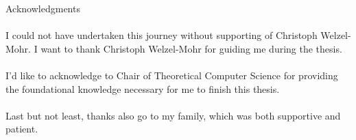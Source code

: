 \thispagestyle{empty}

\vspace*{20mm}

\begin{center}
    { Acknowledgments}
\end{center}

\vspace{10mm}
\paragraph{}
I could not have undertaken this journey without supporting of Christoph Welzel-Mohr.
I want to thank Christoph Welzel-Mohr for guiding me during the thesis.
\paragraph{}
I’d like to acknowledge to Chair of Theoretical Computer Science
for providing the foundational knowledge necessary for me to finish this thesis.
\paragraph{}
Last but not least, thanks also go to my family, which was both supportive and patient.

{\raggedleft\vfill\itshape{}\par
}

\cleardoublepage{}